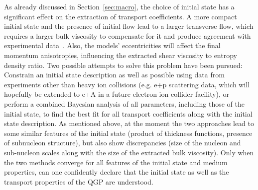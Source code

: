 As already discussed in Section~\ref{sec:macro}, the choice of initial state has 
  a significant effect on the extraction of transport coefficients. 
A more compact initial state and the presence of initial flow lead to a larger 
  transverse flow, which requires a larger bulk viscosity to compensate for it 
	and produce agreement with experimental data~\cite{Schenke:2018fci}. 
Also, the models' eccentricities will affect the final momentum anisotropies, 
  influencing the extracted shear viscosity to entropy density ratio. 
Two possible attempts to solve this problem have been pursued: Constrain an 
  initial state description as well as possible using data from experiments 
	other than heavy ion collisions (e.g. e+p scattering data, which will hopefully 
	be extended to e+A in a future electron ion collider facility), or perform a 
	combined Bayesian analysis of all parameters, including those of the initial state, 
	to find the best fit for all transport coefficients along with the initial 
	state description.
As mentioned above, at the moment the two approaches lead to some similar 
  features of the initial state (product of thickness functions, presence 
	of subnucleon structure), but also show discrepancies (size of the nucleon 
	and sub-nucleon scales along with the size of the extracted bulk viscosity). 
Only when the two methods converge for all features of the initial state and 
  medium properties, can one confidently declare that the initial state as well 
	as the transport properties of the QGP are understood.









